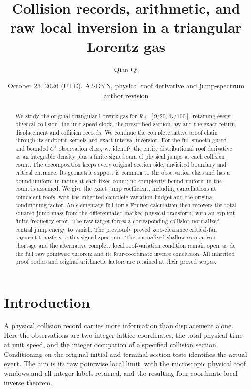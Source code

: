 \documentclass[11pt,reqno]{amsart}
\title[Collision records and raw local inversion]{Collision records, arithmetic, and raw local inversion in a triangular Lorentz gas}
\author{Qian Qi}
\date{October 23, 2026 (UTC). A2-DYN, physical roof derivative and jump-spectrum author revision}
\numberwithin{equation}{section}
\theoremstyle{definition}\newtheorem{definition}[theorem]{Definition}
\theoremstyle{remark}\newtheorem{remark}[theorem]{Remark}
\begin{document}
\raggedbottom
\begin{abstract}
We study the original triangular Lorentz gas for
$R\in[9/20,47/100]$, retaining every physical collision, the
unit-speed clock, the prescribed section law and the exact
return, displacement and collision records. We continue the
complete native proof chain through its endpoint kernels and
exact-interval inversion. For the full smooth-guard and bounded
$C^1$ observation class, we identify the entire distributional
roof derivative as an integrable density plus a finite signed
sum of physical jumps at each collision count. The decomposition
keeps every original section side, unvisited boundary and
critical entrance. Its geometric support is common to the
observation class and has a bound uniform in radius at each
fixed count; no complexity bound uniform in the count is assumed.
We give the exact jump coefficient, including cancellations
at coincident roofs, with the inherited complete variation
budget and the original conditioning factor. An elementary
full-torus Fourier calculation then recovers the total squared
jump mass from the differentiated marked physical transform,
with an explicit finite-frequency error. The raw target forces
a corresponding collision-normalized central jump energy to
vanish. The previously proved zero-clearance critical-fan
payment transfers to this signed spectrum. The normalized
shallow comparison shortage and the alternative complete local
roof-variation condition remain open, as do the full raw
pointwise theorem and its four-coordinate inverse conclusion.
All inherited proof bodies and original arithmetic factors
are retained at their proved scopes.
\end{abstract}
\maketitle
\tableofcontents

\section*{Introduction}
A physical collision record carries more information than displacement
alone. Here the observations are two integer lattice coordinates, the
total physical time at unit speed, and the integer occupation of a
specified collision section. Conditioning on the original initial
and terminal section tests identifies the actual event. The aim is
its raw pointwise local limit, with the microscopic physical roof
windows and all integer labels retained, and the resulting
four-coordinate local inverse theorem.
\end{document}
